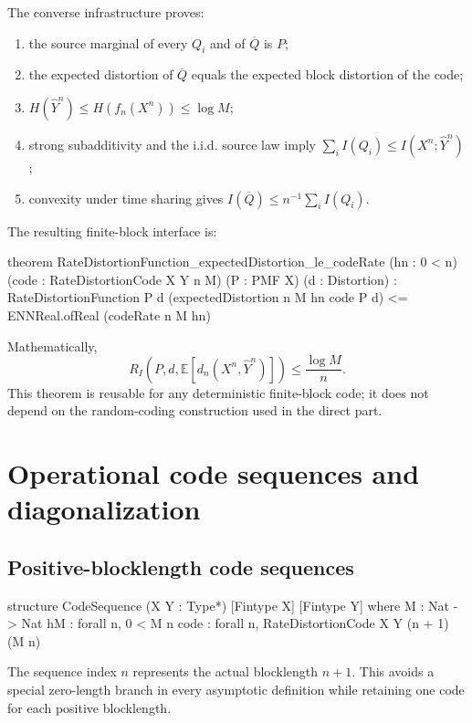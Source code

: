 \documentclass[11pt]{article}
\newcommand{\E}{\mathbb{E}}
\newcommand{\RD}{R_I}
\begin{document}
The converse infrastructure proves:
\begin{enumerate}
  \item the source marginal of every $Q_i$ and of $\overline Q$ is $P$;
  \item the expected distortion of $\overline Q$ equals the expected block
        distortion of the code;
  \item $H(\widehat Y^n)\le H(f_n(X^n))\le\log M$;
  \item strong subadditivity and the i.i.d. source law imply
        $\sum_i I(Q_i)\le I(X^n;\widehat Y^n)$;
  \item convexity under time sharing gives
        $I(\overline Q)\le n^{-1}\sum_i I(Q_i)$.
\end{enumerate}

The resulting finite-block interface is:

\begin{LeanCode}
theorem RateDistortionFunction_expectedDistortion_le_codeRate
    (hn : 0 < n) (code : RateDistortionCode X Y n M)
    (P : PMF X) (d : Distortion) :
  RateDistortionFunction P d
      (expectedDistortion n M hn code P d) <=
    ENNReal.ofReal (codeRate n M hn)
\end{LeanCode}

Mathematically,
\[
  \RD\!\left(P,d,\E[d_n(X^n,\widehat Y^n)]\right)
  \le \frac{\log M}{n}.
\]
This theorem is reusable for any deterministic finite-block code; it does not
depend on the random-coding construction used in the direct part.

\section{Operational code sequences and diagonalization}

\subsection{Positive-blocklength code sequences}

\begin{LeanCode}
structure CodeSequence (X Y : Type*) [Fintype X] [Fintype Y] where
  M : Nat -> Nat
  hM : forall n, 0 < M n
  code : forall n, RateDistortionCode X Y (n + 1) (M n)
\end{LeanCode}

The sequence index $n$ represents the actual blocklength $n+1$.  This avoids a
special zero-length branch in every asymptotic definition while retaining one
code for each positive blocklength.
\end{document}

